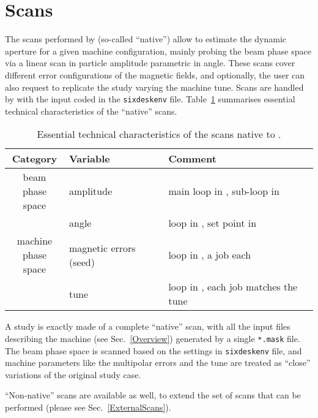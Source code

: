 \section{Scans}\label{Sec:NativeScans}
The scans performed by \SIXDESK{} (so-called ``native'') allow to estimate
the dynamic aperture for a given machine configuration, mainly probing the
beam phase space via a linear scan in particle amplitude parametric in
angle. These scans cover different error configurations of the magnetic
fields, and optionally, the user can also request
to replicate the study varying the machine tune.
Scans are handled by \SIXDESK{} with the input coded
in the \texttt{sixdeskenv} file.
Table~\ref{tab:InternalScanParamters} summarises essential technical
characteristics of the \SIXDESK{} ``native'' scans.
\begin{table}[t]
\begin{center}
    \caption{Essential technical
      characteristics of the scans native to \SIXDESK{}.}
    \label{tab:InternalScanParamters}
    \begin{tabular}{|c|l|l|}
    \hline
    \rowcolor{blue!30}
    \textbf{Category} & \textbf{Variable} & \textbf{Comment} \\
    \hline
    \multirowcell{2}{beam \\ phase space}
    & amplitude & main loop in \SIXDESK{}, sub-loop in \SIXTRACK{} \\
    \cline{2-3}
    & angle     & loop in \SIXDESK{}, set point in \SIXTRACK{} \\
    \hline
    \multirowcell{2}{machine \\ phase space}
    & magnetic errors (seed) & loop in \SIXDESK{}, a \MADX{} job each\\
    \cline{2-3}
    & tune & loop in \SIXDESK{}, each \SIXTRACK{} job matches the tune \\
    \hline
    \end{tabular}
\end{center}
\end{table}

A \SIXDESK{} study is exactly made of a complete ``native'' scan, with all the
\SIXTRACK{} input files describing the machine (see Sec.~\ref{Overview})
generated by a single \texttt{*.mask} file. The beam phase space is scanned
based on the settings in \texttt{sixdeskenv} file, and machine parameters like
the multipolar errors and the tune are treated as ``close'' variations of the
original study case.

``Non-native'' scans are available as well, to extend the set of scans
that can be performed (please see Sec.~\ref{ExternalScans}).

